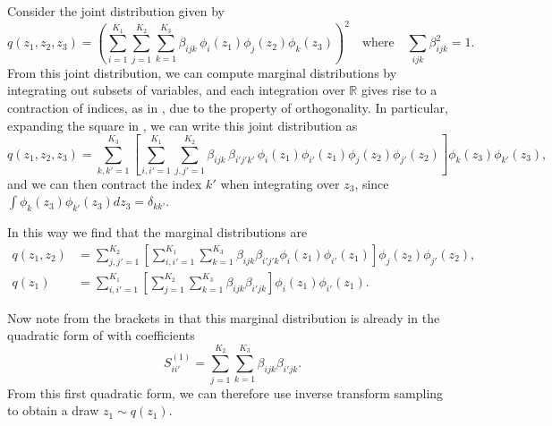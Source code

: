 Consider the joint distribution given by
\begin{equation}
q(z_1,z_2,z_3) = \left(\sum_{i=1}^{K_1}\sum_{j=1}^{K_2}\sum_{k=1}^{K_3} \beta_{ijk}\, \phi_i(z_1)\phi_j(z_2)\phi_k(z_3)\right)^2\quad\mbox{where}\quad \sum_{ijk}\beta^2_{ijk} = 1.
\label{eq:3d-redux}
\end{equation}
From this joint distribution, we can compute marginal distributions by
integrating out subsets of variables, and each integration over $\mathbb{R}$
gives rise to a contraction of indices, as in , due to the
property of orthogonality.
{In particular, expanding the square in
, we can write this joint distribution as
%
\begin{equation}
q(z_1,z_2,z_3) =
    \sum_{k,k'=1}^{K_3}
    \left[\sum_{i,i'=1}^{K_1}
    \sum_{j,j'=1}^{K_2}
\beta_{ijk}\,
\beta_{i'j'k'}\,
    \phi_i(z_1) \phi_{i'}(z_1) \phi_j(z_2) \phi_{j'}(z_2)
    \right] \phi_k(z_3) \phi_{k'}(z_3),
\label{eq:3d-redux2}
\end{equation}
and we can then contract the index $k'$ when integrating over $z_3$, since $\int \phi_k(z_3) \phi_{k'}(z_3) dz_3 = \delta_{kk'}$.
}

In this way we find that the marginal distributions are
\begin{align}
q(z_1,z_2) &= \sum_{j,j'=1}^{K_2} \left[\sum_{i,i'=1}^{K_1}\sum_{k=1}^{K_3} \beta_{ijk}\beta_{i'j'k} \phi_i(z_1)\phi_{i'}(z_1)\right]\phi_j(z_2)\phi_{j'}(z_2), \label{eq:marg2} \\
q(z_1) &= \sum_{i,i'=1}^{K_1} \left[\sum_{j=1}^{K_2}\sum_{k=1}^{K_3} \beta_{ijk}\beta_{i'jk}\right] \phi_i(z_1)\phi_{i'}(z_1).\label{eq:marg1}
\end{align}

Now note from the brackets in  that this marginal distribution
is already in the quadratic form of  with coefficients
\begin{equation}
    S^{(1)}_{ii'} = \sum_{j=1}^{K_2}\sum_{k=1}^{K_3} \beta_{ijk}\beta_{i'jk}.
\end{equation}
From this first quadratic form, we can therefore use inverse transform sampling
to obtain a draw $z_1 \sim q(z_1)$.

